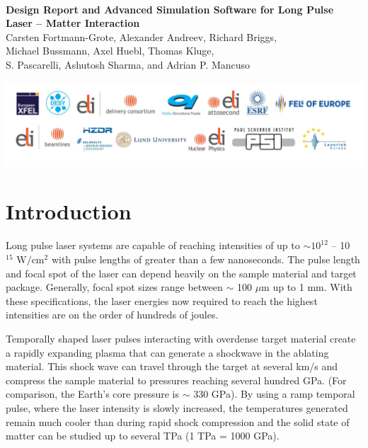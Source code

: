 \documentclass[12pt]{scrartcl}
\begin{document}
\makeatletter
\begin{titlepage}
\thispagestyle{scrheadings}
\begin{center}
$~$\\
\vspace{2cm}
\Huge{\textbf{Design Report and Advanced Simulation Software for Long Pulse Laser -- Matter Interaction}}\\[5mm]
\vspace{2cm}
\large{
Carsten Fortmann-Grote, Alexander Andreev, Richard Briggs,\\ Michael Bussmann,
  Axel Huebl, Thomas Kluge,\\
 S. Pascarelli, Ashutosh Sharma, and Adrian P. Mancuso\\
 }
\vspace{1cm}
\@date
\end{center}
\vspace{5cm}
\includegraphics[width=\textwidth]{./PartnerLogos.pdf}
\normalfont
\end{titlepage}
\makeatother

\section{Introduction}
Long pulse laser systems are capable of reaching intensities of up to $\sim 10^{12}$ -- 10$^{15} \text{ W}/\text{cm}^2$ with pulse lengths of greater than a few nanoseconds. The pulse length and focal spot of the laser can depend heavily on the sample material and target package. Generally, focal spot sizes range between $\sim$ 100 $\mu$m up to 1 mm. With these specifications, the laser energies now required to reach the highest intensities are on the order of hundreds of joules.

Temporally shaped laser pulses interacting with overdense target material create a rapidly expanding plasma that
can generate a shockwave in the ablating material. This shock wave can travel through the target at several km/s
and compress the sample material to pressures reaching several hundred GPa. (For comparison, the Earth's core
pressure is $\sim$ 330 GPa). By using a ramp temporal pulse, where the laser intensity is slowly increased, the temperatures generated remain much cooler than during rapid shock compression and the solid state of matter can be studied up to several TPa (1 TPa = 1000 GPa).
\end{document}
